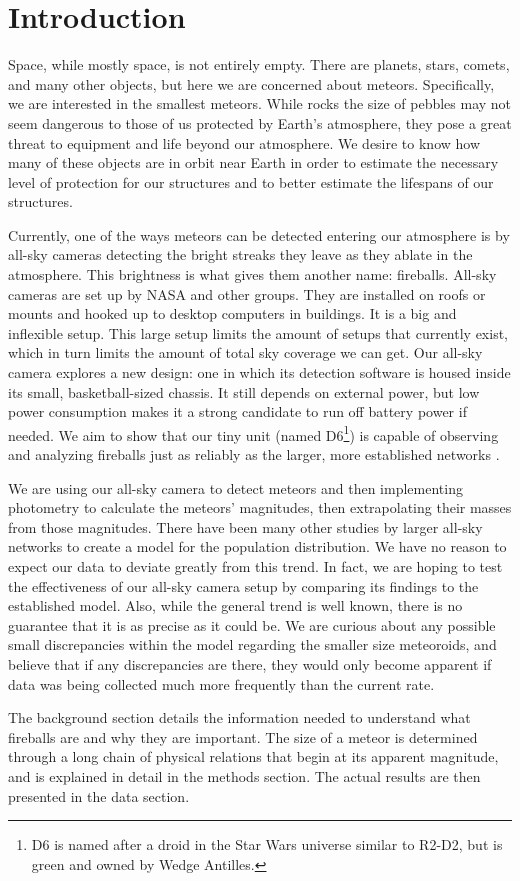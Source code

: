 \chapter{Introduction}

Space, while mostly space, is not entirely empty.  There are planets, stars, comets, and many other objects, but here we are concerned about meteors. Specifically, we are interested in the smallest meteors. While rocks the size of pebbles may not seem dangerous to those of us protected by Earth's atmosphere, they pose a great threat to equipment and life beyond our atmosphere. We desire to know how many of these objects are in orbit near Earth in order to estimate the necessary level of protection for our structures and to better estimate the lifespans of our structures.

Currently, one of the ways meteors can be detected entering our atmosphere is by all-sky cameras detecting the bright streaks they leave as they ablate in the atmosphere. This brightness is what gives them another name: fireballs. All-sky cameras are set up by NASA and other groups\cite{Jenniskens2011,Trigo-Rodriguez2007}. They are installed on roofs or mounts and hooked up to desktop computers in buildings. It is a big and inflexible setup. This large setup limits the amount of setups that currently exist, which in turn limits the amount of total sky coverage we can get. Our all-sky camera explores a new design: one in which its detection software is housed inside its small, basketball-sized chassis. It still depends on external power, but low power consumption makes it a strong candidate to run off battery power if needed. We aim to show that our tiny unit (named D6\footnote{D6 is named after a droid in the Star Wars universe similar to R2-D2, but is green and owned by Wedge Antilles.}) is capable of observing and analyzing fireballs just as reliably as the larger, more established networks .

We are using our all-sky camera to detect meteors and then implementing photometry to calculate the meteors' magnitudes, then extrapolating their masses from those magnitudes. There have been many other studies by larger all-sky networks to create a model for the population distribution. We have no reason to expect our data to deviate greatly from this trend. In fact, we are hoping to test the effectiveness of our all-sky camera setup by comparing its findings to the established model. Also, while the general trend is well known, there is no guarantee that it is as precise as it could be. We are curious about any possible small discrepancies within the model regarding the smaller size meteoroids, and believe that if any discrepancies are there, they would only become apparent if data was being collected much more frequently than the current rate.

The background section details the information needed to understand what fireballs are and why they are important. The size of a meteor is determined through a long chain of physical relations that begin at its apparent magnitude, and is explained in detail in the methods section. The actual results are then presented in the data section.

